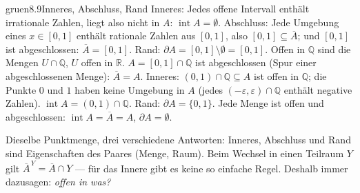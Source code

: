 \begin{loesungkarte}{gruen}{8.9}{Inneres, Abschluss, Rand}
Inneres: Jedes offene Intervall enthält irrationale Zahlen, liegt also nicht in $A$: $\operatorname{int}A = \emptyset$. Abschluss: Jede Umgebung eines $x\in[0, 1]$ enthält rationale Zahlen aus $[0, 1]$, also $[0, 1]\subseteq\overline A$; und $[0, 1]$ ist abgeschlossen: $\overline A = [0, 1]$. Rand: $\partial A = [0, 1]\setminus\emptyset = [0, 1]$.
Offen in $\mathbb Q$ sind die Mengen $U\cap\mathbb Q$, $U$ offen in $\mathbb R$. $A = [0, 1]\cap\mathbb Q$ ist abgeschlossen (Spur einer abgeschlossenen Menge): $\overline A = A$. Inneres: $(0, 1)\cap\mathbb Q\subseteq A$ ist offen in $\mathbb Q$; die Punkte $0$ und $1$ haben keine Umgebung in $A$ (jedes $(-\varepsilon, \varepsilon)\cap\mathbb Q$ enthält negative Zahlen). $\operatorname{int}A = (0, 1)\cap\mathbb Q$. Rand: $\partial A = \{0, 1\}$.
Jede Menge ist offen und abgeschlossen: $\operatorname{int}A = \overline A = A$, $\partial A = \emptyset$.
\begin{mitnehmen}\kastentext
Dieselbe Punktmenge, drei verschiedene Antworten: Inneres, Abschluss und Rand sind Eigenschaften des Paares (Menge, Raum). Beim Wechsel in einen Teilraum $Y$ gilt $\overline A^{\,Y} = \overline A\cap Y$ --- für das Innere gibt es keine so einfache Regel. Deshalb immer dazusagen: \emph{offen in was?}
\end{mitnehmen}
\end{loesungkarte}

